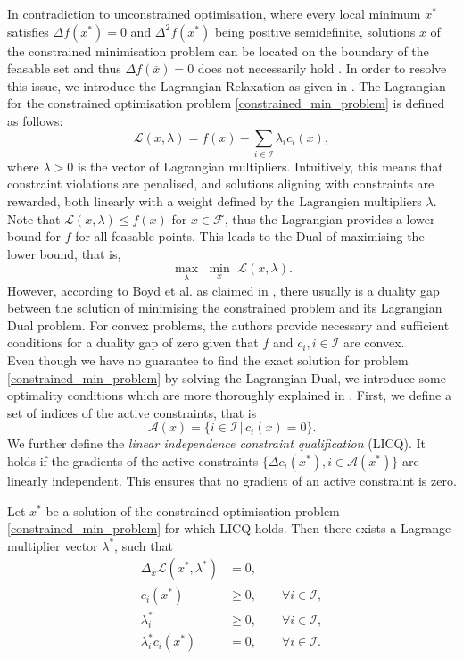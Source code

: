 \indent In contradiction to unconstrained optimisation, where every local minimum $x^*$ satisfies $\Delta f(x^*) = 0$ and $\Delta^2 f(x^*)$ being positive semidefinite, solutions $\overline{x}$ of the constrained minimisation problem can be located on the boundary of the feasable set and thus $\Delta f(\overline{x}) = 0$ does not necessarily hold \cite{NoceWrig06}. In order to resolve this issue, we introduce the Lagrangian Relaxation as given in \cite{Lemarechal:2000:LR:647776.734757}. The Lagrangian for the constrained optimisation problem \ref{constrained_min_problem} is defined as follows:
\[ \mathcal{L}(x, \lambda) = f(x) - \sum_{i \in \mathcal{I}} \lambda_i c_i(x), \]
where $\lambda > 0$ is the vector of Lagrangian multipliers. Intuitively, this means that constraint violations are penalised, and solutions aligning with constraints are rewarded, both linearly with a weight defined by the Lagrangien multipliers $\lambda$. Note that $\mathcal{L}(x, \lambda) \leq f(x)$ for $x \in \mathcal{F}$, thus the Lagrangian provides a lower bound for $f$ for all feasable points.
This leads to the Dual of maximising the lower bound, that is,
\[ \underset{\lambda}{\max}\,\, \underset{x}{\min}\,\, \mathcal{L}(x, \lambda). \]
However, according to Boyd et al. as claimed in \cite{Boyd:2004:CO:993483}, there usually is a duality gap between the solution of minimising the constrained problem and its Lagrangian Dual problem. For convex problems, the authors provide necessary and sufficient conditions for a duality gap of zero given that $f$ and $c_i, i \in \mathcal{I}$ are convex.\\
\indent Even though we have no guarantee to find the exact solution for problem \ref{constrained_min_problem} by solving the Lagrangian Dual, we introduce some optimality conditions which are more thoroughly explained in \cite{NoceWrig06}. First, we define a set of indices of the active constraints, that is
\[ \mathcal{A}(x) = \{ i \in \mathcal{I} \,|\, c_i(x) = 0 \}. \]
We further define the \textit{linear independence constraint qualification} (LICQ). It holds if the gradients of the active constraints $\{ \Delta c_i(x^*), i \in \mathcal{A}(x^*) \}$ are linearly independent. This ensures that no gradient of an active constraint is zero.
\begin{theorem}$\,$\\
	\label{theorem:kkt}
Let $x^*$ be a solution of the constrained optimisation problem \ref{constrained_min_problem} for which LICQ holds. Then there exists a Lagrange multiplier vector $\lambda^*$, such that
\begin{subequations}
	\label{eq:kkt}
	\begin{align}
	\Delta_x \mathcal{L}(x^*, \lambda^*) &= 0,\\
	c_i(x^*) &\geq 0, \qquad \forall i \in \mathcal{I},\\
	\lambda^*_i &\geq 0, \qquad \forall i \in \mathcal{I},\\
	\lambda^*_i  c_i(x^*) &= 0, \qquad \forall i \in \mathcal{I}.
	\end{align}
\end{subequations}
\end{theorem}

